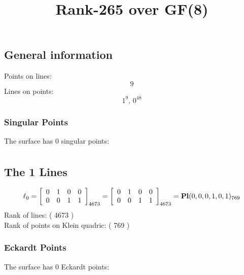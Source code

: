 \documentclass{article}
\newcommand\setTBstruts{\def\T{\rule{0pt}{2.6ex}}%
\def\B{\rule[-1.2ex]{0pt}{0pt}}}
\begin{document}
 
\setTBstruts



{\allowdisplaybreaks%






\title{Rank-265 over GF(8)}
\author{}%
\maketitle%
%
{}



\subsection*{General information}
Points on lines:
$$
9$$
Lines on points:
$$
1^9,\,0^{48}$$
\subsubsection*{Singular Points}
The surface has 0 singular points:\\
\begin{align*}
\end{align*}
\subsection*{The 1 Lines}
$$
\ell_{0} = 
\left[
\begin{array}{*{4}{r}}
0 & 1 & 0 & 0\\
0 & 0 & 1 & 1\\
\end{array}
\right]
_{4673}
=
\left[
\begin{array}{*{4}c}
0  & 1  & 0  & 0\\
0  & 0  & 1  & 1\\
\end{array}
\right]_{4673}
={\rm\bf Pl}(0,0,0,1,0,1 )_{769}$$
Rank of lines: ( 4673 )\\
Rank of points on Klein quadric: ( 769 )\\
\subsubsection*{Eckardt Points}
The surface has 0 Eckardt points:\\
}
\end{document}
